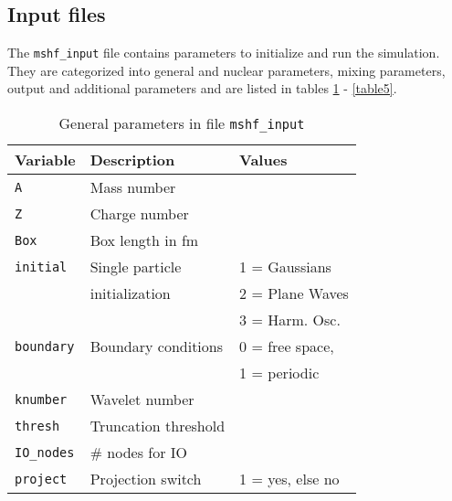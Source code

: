 \documentclass[4p]{elsarticle}
\begin{document}
\subsection{Input files}
The {\tt mshf\_input} file contains parameters to initialize and run the simulation. They are categorized into general and nuclear parameters, mixing parameters, output and additional parameters and are listed in tables \ref{table1} - \ref{table5}.
\begin{table}
\caption{General parameters in file \texttt{mshf\_input}}
\begin{tabular*}{\columnwidth}{ l l l}
\hline
\hline
Variable & Description & Values\\
\hline
\texttt{A}                   & Mass number                                                    & \\
\texttt{Z}                   & Charge number                                                 & \\
\texttt{Box}               & Box length in fm                       & \\
\texttt{initial}             & Single particle                    & 1 = Gaussians\\
                                 & initialization                                                                          & 2 = Plane Waves\\
                                 &                                   			                  & 3 = Harm. Osc.\\
\texttt{boundary}       & Boundary conditions            & 0 = free space,\\          
				& 						                  & 1 = periodic\\                        
\texttt{knumber}        & Wavelet number                                                & \\
\texttt{thresh}            & Truncation threshold                                     & \\
\texttt{IO\_nodes}     & \# nodes for IO                                     & \\
\texttt{project}           & Projection switch                   & 1 = yes, else no \\
\hline
\hline
\end{tabular*}
\label{table1}
\end{table}
\end{document}
